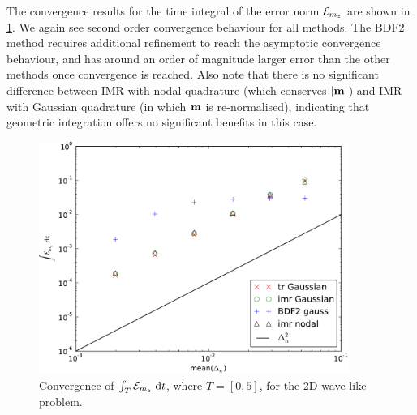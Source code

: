 The convergence results for the time integral of the error norm $\mathcal{E}_{m_z}$ are shown in \cref{fig:convergence-long-time-mz-norm}.
We again see second order convergence behaviour for all methods.
The BDF2 method requires additional refinement to reach the asymptotic convergence behaviour, and has around an order of magnitude larger error than the other methods once convergence is reached.
Also note that there is no significant difference between IMR with nodal quadrature (which conserves $\left|{\boldsymbol{\mathrm{m}}} \right|$) and IMR with Gaussian quadrature (in which $\boldsymbol{\mathrm{m}}$ is re-normalised), indicating that geometric integration offers no significant benefits in this case.
\begin{figure}
  \centering
  \includegraphics[width=0.9\textwidth]{plots/2d_wave_solution_convergence_long_time/auxerr1integralvsmeanofdts.pdf}
  \caption{Convergence of ${\int_T {\mathcal{E}_{m_z}} {\; \mathrm{{d}}} t}$, where $T=[0,5]$, for the 2D wave-like problem.
  }
  \label{fig:convergence-long-time-mz-norm}
\end{figure}




